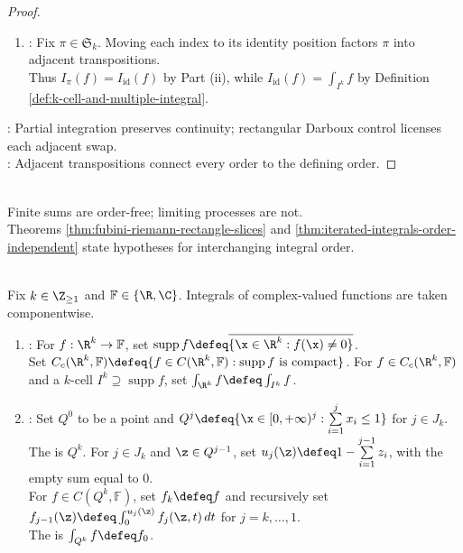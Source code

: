 \begin{theorem}
\begin{proof}
\begin{enumerate}[label=(\roman*)]
Transposed grids preserve Darboux sums. Adjacent integrals commute by Theorem \ref{thm:fubini-riemann-rectangle-slices}(iii) in both coordinate orientations.
\item {}: Fix $\pi\in\mathfrak S_k$. Moving each index to its identity position factors $\pi$ into adjacent transpositions.\\
Thus $I_\pi(f)=I_{\mathrm{id}}(f)$ by Part (ii), while $I_{\mathrm{id}}(f)=\int_{I^k}f$ by Definition \ref{def:k-cell-and-multiple-integral}.
\end{enumerate}
: Partial integration preserves continuity; rectangular Darboux control licenses each adjacent swap.\\
: Adjacent transpositions connect every order to the defining order.
\end{proof}
\end{theorem}

\begin{perspective} \label{per:fubini-hypotheses-control-order} \\
Finite sums are order-free; limiting processes are not.\\
Theorems \ref{thm:fubini-riemann-rectangle-slices} and \ref{thm:iterated-integrals-order-independent} state hypotheses for interchanging integral order.
\end{perspective}

\begin{definition} \label{def:support-and-compact-support-integral} \\
Fix $k\in\Z_{\geq1}$ and $\mathbb F\in\{\R,\C\}$. Integrals of complex-valued functions are taken componentwise.
\begin{enumerate}[label=(\roman*)]
\setlength{\itemsep}{0pt}
\item {}: For $f:\R^k\to\mathbb F$, set $\operatorname{supp}f\defeq\overline{\{\x\in\R^k:f(\x)\neq0\}}$.\\
Set $C_c(\R^k,\mathbb F)\defeq\{f\in C(\R^k,\mathbb F):\operatorname{supp}f\text{ is compact}\}$. For $f\in C_c(\R^k,\mathbb F)$ and a $k$-cell $I^k\supseteq\operatorname{supp}f$, set $\int_{\R^k}f\defeq\int_{I^k}f$.
\item {}: Set $Q^0$ to be a point and $Q^j\defeq\{\x\in[0,+\infty)^j:\sum\limits_{i=1}^{j}x_i\leq1\}$ for $j\in J_k$.\\
The  is $Q^k$. For $j\in J_k$ and $\z\in Q^{j-1}$, set $u_j(\z)\defeq1-\sum\limits_{i=1}^{j-1}z_i$, with the empty sum equal to $0$.\\
For $f\in C(Q^k,\mathbb F)$, set $f_k\defeq f$ and recursively set $f_{j-1}(\z)\defeq\int_0^{u_j(\z)}f_j(\z,t)\,dt$ for $j=k,\ldots,1$.\\
The  is $\int_{Q^k}f\defeq f_0$.
\end{enumerate}
\end{definition}

